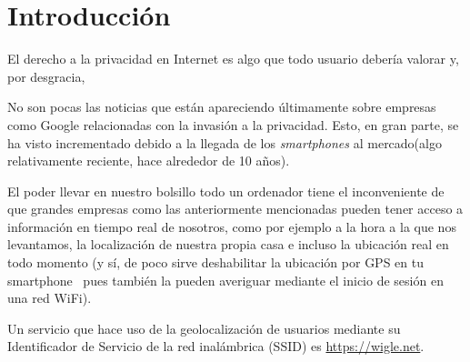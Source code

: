 \chapter{Introducción} 
\label{chap:intro}

\vspace{-0.2cm}

El derecho a la privacidad en Internet es algo que todo usuario
debería valorar y, por desgracia, 


No son pocas las noticias que están apareciendo últimamente sobre
empresas como Google relacionadas con la invasión a la
privacidad. Esto, en gran parte, se ha visto incrementado debido a la
llegada de los \textit{smartphones} al mercado(algo relativamente
reciente, hace alrededor de 10 años). 

El poder llevar en nuestro bolsillo todo un ordenador tiene el inconveniente de que grandes empresas como las anteriormente mencionadas pueden tener acceso a
información en tiempo real de nosotros, como por ejemplo a la hora a
la que nos levantamos, la localización de nuestra propia casa e
incluso la ubicación real en todo momento (y sí, de poco sirve
deshabilitar la ubicación por GPS en tu smartphone~\cite{article:GPSTracking} pues también la
pueden averiguar mediante el inicio de sesión en una red WiFi).

Un servicio que hace uso de la geolocalización de usuarios mediante su Identificador de Servicio de la red inalámbrica (SSID) es \url{https://wigle.net}.



